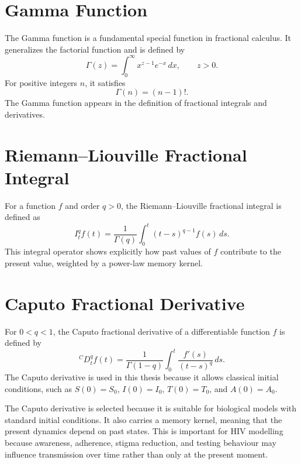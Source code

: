 \documentclass[12pt,a4paper,oneside]{report}
\newcommand{\CaputoD}[2]{{}^{C}D_{#1}^{#2}}
\begin{document}
\section{Gamma Function}
The Gamma function is a fundamental special function in fractional calculus. It generalizes the factorial function and is defined by
\begin{equation}
\Gamma(z)=\int_0^\infty x^{z-1}e^{-x}\,dx, \qquad z>0.
\end{equation}
For positive integers $n$, it satisfies
\begin{equation}
\Gamma(n)=(n-1)!.
\end{equation}
The Gamma function appears in the definition of fractional integrals and derivatives.

\section{Riemann--Liouville Fractional Integral}
For a function $f$ and order $q>0$, the Riemann--Liouville fractional integral is defined as
\begin{equation}
I_t^q f(t)=\frac{1}{\Gamma(q)}\int_0^t (t-s)^{q-1}f(s)\,ds.
\end{equation}
This integral operator shows explicitly how past values of $f$ contribute to the present value, weighted by a power-law memory kernel.

\section{Caputo Fractional Derivative}
For $0<q<1$, the Caputo fractional derivative of a differentiable function $f$ is defined by
\begin{equation}
\CaputoD{t}{q}f(t)=\frac{1}{\Gamma(1-q)}\int_0^t \frac{f'(s)}{(t-s)^q}\,ds.
\label{eq:caputo_definition}
\end{equation}
The Caputo derivative is used in this thesis because it allows classical initial conditions, such as $S(0)=S_0$, $I(0)=I_0$, $T(0)=T_0$, and $A(0)=A_0$.

\begin{remarkbox}[title={Why the Caputo Derivative is Selected}]
The Caputo derivative is selected because it is suitable for biological models with standard initial conditions. It also carries a memory kernel, meaning that the present dynamics depend on past states. This is important for HIV modelling because awareness, adherence, stigma reduction, and testing behaviour may influence transmission over time rather than only at the present moment.
\end{remarkbox}
\end{document}
